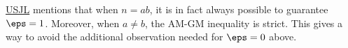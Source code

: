 \documentclass[11pt]{scrartcl}
\begin{document}
\begin{remark*}
  \href{https://aops.com/community/p35341804}{USJL} mentions that when $n = ab$,
  it is in fact always possible to guarantee $\eps = 1$.
  Moreover, when $a \neq b$, the AM-GM inequality is strict.
  This gives a way to avoid the additional observation needed for $\eps = 0$ above.
\end{remark*}
\pagebreak
\end{document}

